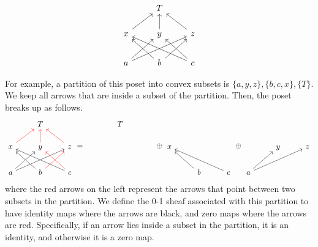 \documentclass{article}
\theoremstyle{definition}
\begin{document}
\[
\begin{tikzcd}
	& T & \\
	x \arrow{ur} & y \arrow{u} & z \arrow{ul} \\
	a \arrow{ur} \arrow{urr} & b\arrow{ur} \arrow{ul} & c \arrow{ul} \arrow{ull}
\end{tikzcd}
\]

For example, a partition of this poset into convex subsets is $\{a,y,z\}, \{b,c,x\}, \{T\}$. We keep all arrows that are inside a subset of the partition. Then, the poset breaks up as follows.
\[
\begin{tikzcd}
	& T & \\
	x \arrow[red]{ur} & y \arrow[red]{u} & z \arrow[red]{ul} \\
	a \arrow{ur} \arrow{urr} & b\arrow[red]{ur} \arrow{ul} & c \arrow[red]{ul} \arrow{ull}
\end{tikzcd}
 = 
 \begin{tikzcd}
	& T & \\
	{\color{white}x} \arrow[white]{ur} & {\color{white}y} \arrow[white]{u} & {\color{white}z} \arrow[white]{ul} \\
	{\color{white}a} \arrow[white]{ur} \arrow[white]{urr} & {\color{white}b}\arrow[white]{ur} \arrow[white]{ul} & {\color{white}c} \arrow[white]{ul} \arrow[white]{ull}
\end{tikzcd}
\oplus
\begin{tikzcd}
	& {\color{white}T} & \\
	x \arrow[white]{ur} & {\color{white}y} \arrow[white]{u} & {\color{white}z} \arrow[white]{ul} \\
	{\color{white}a} \arrow[white]{ur} \arrow[white]{urr} & b\arrow[white]{ur} \arrow{ul} & c \arrow[white]{ul} \arrow{ull}
\end{tikzcd}
\oplus
\begin{tikzcd}
	& {\color{white}T} & \\
	{\color{white}x} \arrow[white]{ur} & y \arrow[white]{u} & z \arrow[white]{ul} \\
	a \arrow{ur} \arrow{urr} & {\color{white}b}\arrow[white]{ur} \arrow[white]{ul} & {\color{white}c} \arrow[white]{ul} \arrow[white]{ull}
\end{tikzcd}
\]
where the red arrows on the left represent the arrows that point between two subsets in the partition. We define the 0-1 sheaf associated with this partition to have identity maps where the arrows are black, and zero maps where the arrows are red. Specifically, if an arrow lies inside a subset in the partition, it is an identity, and otherwise it is a zero map.\\
\end{document}
